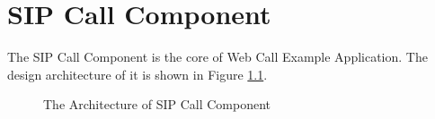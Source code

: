 
\chapter{SIP Call Component}
\label{sec:SIPCallComponent}

The SIP Call Component is the core of Web Call Example Application. The design architecture of it is shown in Figure \ref{fig:TheArchitectureOfSIPCallComponent}.


\begin{figure}[!hbtp]
\centering
{}
\caption{The Architecture of SIP Call Component}
\label{fig:TheArchitectureOfSIPCallComponent}
\end{figure}


